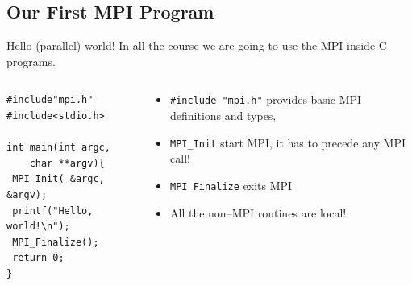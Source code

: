 \documentclass[xcolor={svgnames,usenames}]{beamer}
\begin{document}
\subsection{Our First MPI Program}

\begin{frame}[fragile]{Hello (parallel) world!}
In all the course we are going to use the MPI inside C programs.
\begin{columns}
\begin{column}{0.4\columnwidth}
\begin{verbatim}
#include"mpi.h"
#include<stdio.h>

int main(int argc, 
	char **argv){
 MPI_Init( &argc, &argv);
 printf("Hello, world!\n");
 MPI_Finalize();
 return 0;
}
\end{verbatim}
\end{column}
\begin{column}{0.56\columnwidth}
\small
\begin{itemize}
	\item \texttt{#include "mpi.h"} provides basic MPI definitions and types,
	\item \texttt{MPI_Init} start MPI, it has to precede any MPI call!
	\item \texttt{MPI_Finalize} exits MPI
	\item All the non--MPI routines are local!
\end{itemize}
\end{column}
\end{columns}
\vfill
{}
\end{frame}
\end{document}
